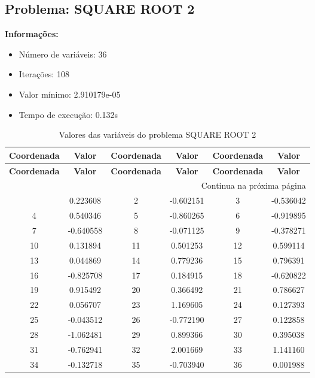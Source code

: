 \documentclass[12pt]{article}
\begin{document}
\newpage            
\subsection{Problema: SQUARE ROOT 2}

\textbf{Informações:}
\begin{itemize}
\item Número de variáveis: 36
\item Iterações: 108
\item Valor mínimo: 2.910179e-05
\item Tempo de execução: 0.132s
\end{itemize}

\small
\begin{longtable}{@{}cc|cc|cc@{}}
\caption{Valores das variáveis do problema SQUARE ROOT 2} \\
\toprule
\textbf{Coordenada} & \textbf{Valor} & \textbf{Coordenada} & \textbf{Valor} & \textbf{Coordenada} & \textbf{Valor} \\
\midrule
\endfirsthead

\toprule
\textbf{Coordenada} & \textbf{Valor} & \textbf{Coordenada} & \textbf{Valor} & \textbf{Coordenada} & \textbf{Valor} \\
\midrule
\endhead

\midrule \multicolumn{6}{r}{{Continua na próxima página}} \\ \midrule
\endfoot

\bottomrule
\endlastfoot
1 & 0.223608 & 2 & -0.602151 & 3 & -0.536042 \\
4 & 0.540346 & 5 & -0.860265 & 6 & -0.919895 \\
7 & -0.640558 & 8 & -0.071125 & 9 & -0.378271 \\
10 & 0.131894 & 11 & 0.501253 & 12 & 0.599114 \\
13 & 0.044869 & 14 & 0.779236 & 15 & 0.796391 \\
16 & -0.825708 & 17 & 0.184915 & 18 & -0.620822 \\
19 & 0.915492 & 20 & 0.366492 & 21 & 0.786627 \\
22 & 0.056707 & 23 & 1.169605 & 24 & 0.127393 \\
25 & -0.043512 & 26 & -0.772190 & 27 & 0.122858 \\
28 & -1.062481 & 29 & 0.899366 & 30 & 0.395038 \\
31 & -0.762941 & 32 & 2.001669 & 33 & 1.141160 \\
34 & -0.132718 & 35 & -0.703940 & 36 & 0.001988 \\

\end{longtable}
\end{document}
